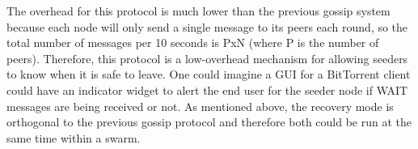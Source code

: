 The overhead for this protocol is much lower than the previous gossip
system because each node will only send a single message to its peers
each round, so the total number of messages per 10 seconds is PxN (where P is the number of peers). Therefore,
this protocol is a low-overhead mechanism for allowing seeders to know when it is safe
to leave. One could imagine a GUI for a BitTorrent client could have an indicator widget
to alert the end user for the seeder node if WAIT messages are being received or not. As
mentioned above, the recovery mode is orthogonal to the previous gossip
protocol and therefore both could be run at the same time within a swarm.
